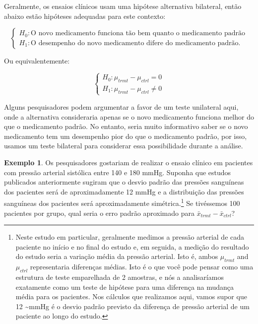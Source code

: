 \documentclass[
]{book}
\theoremstyle{definition}
\theoremstyle{definition}
\newtheorem{example}{Exemplo}[chapter]
\theoremstyle{definition}
\theoremstyle{definition}
\theoremstyle{remark}
\begin{document}
Geralmente, os ensaios clínicos usam uma hipótese alternativa bilateral, então abaixo estão hipóteses adequadas para este contexto:

\[
\begin{cases}
  H_0: \mbox{O novo medicamento funciona tão bem quanto o medicamento padrão} \\
  H_1: \mbox{O desempenho do novo medicamento difere do medicamento padrão.}
\end{cases}
\]

Ou equivalentemente:

\[
\begin{cases}
  H_0: \mu_{trmt} - \mu_{ctrl} = 0 \\
  H_1: \mu_{trmt} - \mu_{ctrl} \neq 0
\end{cases}
\]

Alguns pesquisadores podem argumentar a favor de um teste unilateral aqui, onde a alternativa consideraria apenas se o novo medicamento funciona melhor do que o medicamento padrão. No entanto, seria muito informativo saber se o novo medicamento tem um desempenho pior do que o medicamento padrão, por isso, usamos um teste bilateral para considerar essa possibilidade durante a análise.

\begin{example}
\protect\hypertarget{exm:unnamed-chunk-208}{}{\label{exm:unnamed-chunk-208} }Os pesquisadores gostariam de realizar o ensaio clínico em pacientes com pressão arterial sistólica entre 140 e 180 mmHg. Suponha que estudos publicados anteriormente sugiram que o desvio padrão das pressões sanguíneas dos pacientes será de aproximadamente 12 mmHg e a distribuição das pressões sanguíneas dos pacientes será aproximadamente simétrica.\footnote{Neste estudo em particular, geralmente medimos a pressão arterial de cada paciente no início e no final do estudo e, em seguida, a medição do resultado do estudo seria a variação média da pressão arterial. Isto é, ambos \(\mu_{trmt}\) and \(\mu_{ctrl}\) representaria diferenças médias. Isto é o que você pode pensar como uma estrutura de teste emparelhada de 2 amostras, e nós a analisaríamos exatamente como um teste de hipótese para uma diferença na mudança média para os pacientes. Nos cálculos que realizamos aqui, vamos supor que 12 \textasciitilde mmHg é o desvio padrão previsto da diferença de pressão arterial de um paciente ao longo do estudo.} Se tivéssemos 100 pacientes por grupo, qual seria o erro padrão aproximado para \(\bar{x}_{trmt} - \bar{x}_{ctrl}\)?
\end{example}
\end{document}
